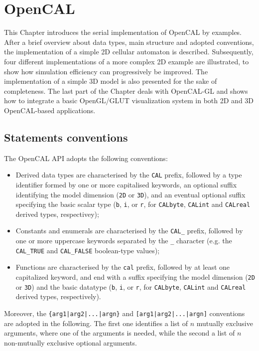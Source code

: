 \chapter{OpenCAL}\label{ch:opencal}

This Chapter introduces the serial implementation of OpenCAL by
examples. After a brief overview about data types, main structure and
adopted conventions, the implementation of a simple 2D cellular
automaton is described. Subsequently, four different implementations
of a more complex 2D example are illustrated, to show how simulation
efficiency can progressively be improved. The implementation of a
simple 3D model is also presented for the sake of completeness. The
last part of the Chapter deals with OpenCAL-GL and shows how to
integrate a basic OpenGL/GLUT visualization system in both 2D and 3D
OpenCAL-based applications.

\section{Statements conventions}\label{sec:Conventions}
 The OpenCAL API adopts the following conventions:
  \begin{itemize}
  \item Derived data types are characterised by the \verb'CAL' prefix,
    followed by a type identifier formed by one or more capitalised
    keywords, an optional suffix identifying the model dimension
    (\verb'2D' or \verb'3D'), and an eventual optional suffix
    specifying the basic scalar type (\verb'b', \verb'i', or \verb'r',
    for \verb'CALbyte', \verb'CALint' and \verb'CALreal' derived
    types, respectivey);
  \item Constants and enumerals are characterised by the \verb'CAL_'
    prefix, followed by one or more uppercase keywords separated by
    the \verb'_' character (e.g. the \verb'CAL_TRUE' and
    \verb'CAL_FALSE' boolean-type values);
  \item Functions are characterised by the \verb'cal' prefix, followed
    by at least one capitalized keyword, and end with a suffix
    specifying the model dimension (\verb'2D' or \verb'3D') and the
    basic datatype (\verb'b', \verb'i', or \verb'r', for
    \verb'CALbyte', \verb'CALint' and \verb'CALreal' derived types,
    respectively).
  \end{itemize}
  Moreover, the \verb'{arg1|arg2|...|argn}' and
  \verb'[arg1|arg2|...|argn]' conventions are adopted in the
  following. The first one identifies a list of $n$ mutually exclusive
  arguments, where one of the arguments is needed, while the second a
  list of $n$ non-mutually exclusive optional arguments.


